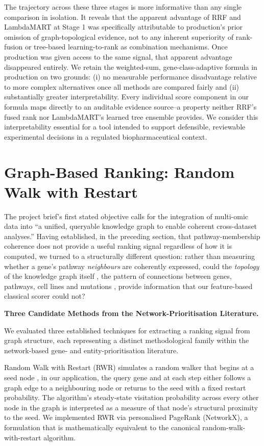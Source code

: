 \documentclass[author={Karen Coutinho, Ishaan Bhalla, Aman Raj, Dixit Kaloorani Malarmannan},
                supervisor={Dr. Daniel D'Andrea},
                degree={MSc},
                title={CellSelector Omics: A Multi-Omics Recommendation System for Cell Line Selection},
                subtitle={},
                type={},
                year={2026}]{dissertation}
\begin{document}
The trajectory across these three stages is more informative than any single comparison in isolation. It reveals that the apparent advantage of RRF and LambdaMART at Stage 1 was specifically attributable to production's prior omission of graph-topological evidence, not to any inherent superiority of rank-fusion or tree-based learning-to-rank as combination mechanisms. Once production was given access to the same signal, that apparent advantage disappeared entirely. We retain the weighted-sum, gene-class-adaptive formula in production on two grounds: (i) no measurable performance disadvantage relative to more complex alternatives once all methods are compared fairly and (ii) substantially greater interpretability. Every individual score component in our formula maps directly to an auditable evidence source--a property neither RRF's fused rank nor LambdaMART's learned tree ensemble provides. We consider this interpretability essential for a tool intended to support defensible, reviewable experimental decisions in a regulated biopharmaceutical context.


\section{Graph-Based Ranking: Random Walk with Restart}

The project brief's first stated objective calls for the integration of multi-omic data into ``a unified, queryable knowledge graph to enable coherent cross-dataset analyses.'' Having established, in the preceding section, that pathway-membership coherence does not provide a useful ranking signal regardless of how it is computed, we turned to a structurally different question: rather than measuring whether a gene's pathway \textit{neighbours} are coherently expressed, could the \textit{topology} of the knowledge graph itself , the pattern of connections between genes, pathways, cell lines and mutations , provide information that our feature-based classical scorer could not?

{\bf Three Candidate Methods from the Network-Prioritisation Literature.}

We evaluated three established techniques for extracting a ranking signal from graph structure, each representing a distinct methodological family within the network-based gene- and entity-prioritisation literature.

Random Walk with Restart (RWR) \cite{kohler2008} simulates a random walker that begins at a seed node , in our application, the query gene  and at each step either follows a graph edge to a neighbouring node or returns to the seed with a fixed restart probability. The algorithm's steady-state visitation probability across every other node in the graph is interpreted as a measure of that node's structural proximity to the seed. We implemented RWR via personalised PageRank (NetworkX), a formulation that is mathematically equivalent to the canonical random-walk-with-restart algorithm.
\end{document}
